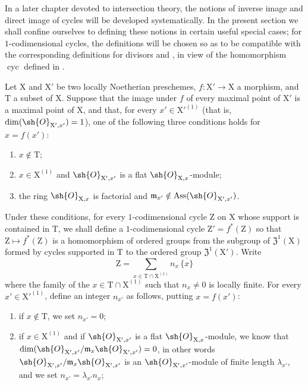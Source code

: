 In a later chapter devoted to intersection theory, the notions of inverse image and direct image of cycles will be developed systematically.
In the present section we shall confine ourselves to defining these notions in certain useful special cases; for $1$-codimensional cycles, the definitions will be chosen so as to be compatible with the corresponding definitions for divisors  and , in view of the homomorphism $\operatorname{cyc}$ defined in .

\begin{env}[21.10.1]
\label{IV.21.10.1}
Let $\mathrm{X}$ and $\mathrm{X}'$ be two locally Noetherian preschemes, $f:\mathrm{X}'\to\mathrm{X}$ a morphism, and $\mathrm{T}$ a subset of $\mathrm{X}$.
Suppose that the image under $f$ of every maximal point of $\mathrm{X}'$ is a maximal point of $\mathrm{X}$, and that, for every $x'\in\mathrm{X}'^{(1)}$ (that is, $\dim(\sh{O}_{\mathrm{X}',x'})=1$), one of the following three conditions holds for $x=f(x')$:
\begin{enumerate}[label=(\roman*)]
  \item $x\notin\mathrm{T}$;
  \item $x\in\mathrm{X}^{(1)}$ and $\sh{O}_{\mathrm{X}',x'}$ is a flat $\sh{O}_{\mathrm{X},x}$-module;
  \item the ring $\sh{O}_{\mathrm{X},x}$ is factorial and $\mathfrak{m}_{x'}\notin\operatorname{Ass}(\sh{O}_{\mathrm{X}',x'})$.
\end{enumerate}
Under these conditions, for every $1$-codimensional cycle $\mathrm{Z}$ on $\mathrm{X}$ whose support is contained in $\mathrm{T}$, we shall define a $1$-codimensional cycle $\mathrm{Z}'=f^*(\mathrm{Z})$ so that $\mathrm{Z}\mapsto f^*(\mathrm{Z})$ is a homomorphism of ordered groups from the subgroup of $\mathfrak{Z}^1(\mathrm{X})$ formed by cycles supported in $\mathrm{T}$ to the ordered group $\mathfrak{Z}^1(\mathrm{X}')$.
Write
\[
\label{IV.21.10.1.1}
  \mathrm{Z} = \sum_{x\in\mathrm{T}\cap\mathrm{X}^{(1)}} n_x\,\overline{\{x\}}
  \tag{21.10.1.1}
\]
where the family of the $x\in\mathrm{T}\cap\mathrm{X}^{(1)}$ such that $n_x\neq 0$ is locally finite.
For every $x'\in\mathrm{X}'^{(1)}$, define an integer $n_{x'}$ as follows, putting $x=f(x')$:
\begin{enumerate}[label=\arabic*\textsuperscript{o}]
  \item if $x\notin\mathrm{T}$, we set $n_{x'}=0$;
  \item if $x\in\mathrm{X}^{(1)}$ and if $\sh{O}_{\mathrm{X}',x'}$ is a flat $\sh{O}_{\mathrm{X},x}$-module, we know  that $\dim(\sh{O}_{\mathrm{X}',x'}/\mathfrak{m}_x\sh{O}_{\mathrm{X}',x'})=0$, in other words $\sh{O}_{\mathrm{X}',x'}/\mathfrak{m}_x\sh{O}_{\mathrm{X}',x'}$ is an $\sh{O}_{\mathrm{X}',x'}$-module of finite length $\lambda_{x'}$, and we set $n_{x'}=\lambda_{x'}n_x$;

\end{enumerate}
\end{env}
